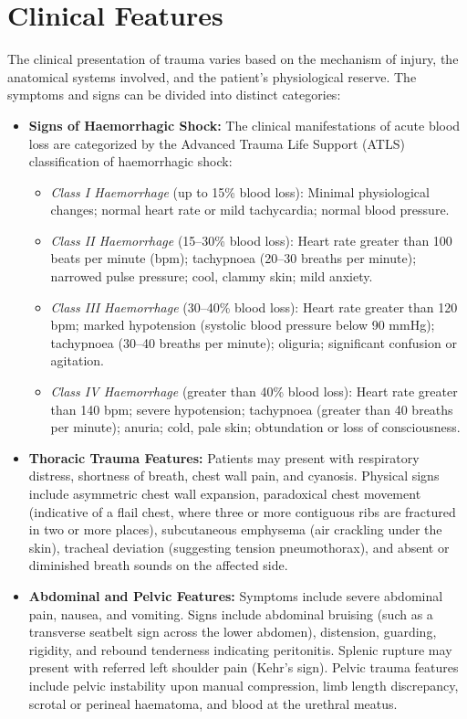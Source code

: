 \section*{Clinical Features}
The clinical presentation of trauma varies based on the mechanism of injury, the anatomical systems involved, and the patient's physiological reserve. The symptoms and signs can be divided into distinct categories:
\begin{itemize}
    \item \textbf{Signs of Haemorrhagic Shock:} The clinical manifestations of acute blood loss are categorized by the Advanced Trauma Life Support (ATLS) classification of haemorrhagic shock:
    \begin{itemize}
        \item \textit{Class I Haemorrhage} (up to 15\% blood loss): Minimal physiological changes; normal heart rate or mild tachycardia; normal blood pressure.
        \item \textit{Class II Haemorrhage} (15--30\% blood loss): Heart rate greater than 100 beats per minute (bpm); tachypnoea (20--30 breaths per minute); narrowed pulse pressure; cool, clammy skin; mild anxiety.
        \item \textit{Class III Haemorrhage} (30--40\% blood loss): Heart rate greater than 120 bpm; marked hypotension (systolic blood pressure below 90 mmHg); tachypnoea (30--40 breaths per minute); oliguria; significant confusion or agitation.
        \item \textit{Class IV Haemorrhage} (greater than 40\% blood loss): Heart rate greater than 140 bpm; severe hypotension; tachypnoea (greater than 40 breaths per minute); anuria; cold, pale skin; obtundation or loss of consciousness.
    \end{itemize}
    \item \textbf{Thoracic Trauma Features:} Patients may present with respiratory distress, shortness of breath, chest wall pain, and cyanosis. Physical signs include asymmetric chest wall expansion, paradoxical chest movement (indicative of a flail chest, where three or more contiguous ribs are fractured in two or more places), subcutaneous emphysema (air crackling under the skin), tracheal deviation (suggesting tension pneumothorax), and absent or diminished breath sounds on the affected side.
    \item \textbf{Abdominal and Pelvic Features:} Symptoms include severe abdominal pain, nausea, and vomiting. Signs include abdominal bruising (such as a transverse seatbelt sign across the lower abdomen), distension, guarding, rigidity, and rebound tenderness indicating peritonitis. Splenic rupture may present with referred left shoulder pain (Kehr's sign). Pelvic trauma features include pelvic instability upon manual compression, limb length discrepancy, scrotal or perineal haematoma, and blood at the urethral meatus.

\end{itemize}
